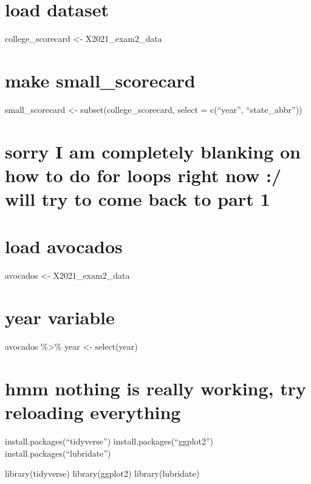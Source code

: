 \documentclass[
]{article}
\begin{document}
\hypertarget{load-dataset-1}{%
\section{load dataset}\label{load-dataset-1}}

college\_scorecard \textless- X2021\_exam2\_data

\hypertarget{make-small_scorecard}{%
\section{make small\_scorecard}\label{make-small_scorecard}}

small\_scorecard \textless- subset(college\_scorecard, select =
c(``year'', ``state\_abbr''))

\hypertarget{sorry-i-am-completely-blanking-on-how-to-do-for-loops-right-now-will-try-to-come-back-to-part-1}{%
\section{sorry I am completely blanking on how to do for loops right now
:/ will try to come back to part
1}\label{sorry-i-am-completely-blanking-on-how-to-do-for-loops-right-now-will-try-to-come-back-to-part-1}}

\hypertarget{load-avocados}{%
\section{load avocados}\label{load-avocados}}

avocados \textless- X2021\_exam2\_data

\hypertarget{year-variable}{%
\section{year variable}\label{year-variable}}

avocados \%\textgreater\% year \textless- select(year)

\hypertarget{hmm-nothing-is-really-working-try-reloading-everything}{%
\section{hmm nothing is really working, try reloading
everything}\label{hmm-nothing-is-really-working-try-reloading-everything}}

install.packages(``tidyverse'') install.packages(``ggplot2'')
install.packages(``lubridate'')

library(tidyverse) library(ggplot2) library(lubridate)
\end{document}
